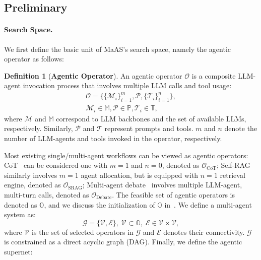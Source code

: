 \documentclass{article}
\theoremstyle{plain}
\theoremstyle{definition}
\newtheorem{definition}[theorem]{Definition}
\theoremstyle{remark}
\newcommand{\ourmethod}{{{MaAS}}\xspace}
\begin{document}
\vspace{-0.4em}
\subsection{Preliminary}\label{sec:prelim}
\vspace{-0.4em}
\paragraph{Search Space.} We first define the basic unit of \ourmethod's search space, namely the agentic operator as follows:
\begin{definition}[\textbf{Agentic Operator}]
\label{def:operator}
An agentic operator $\mathcal{O}$ is a composite LLM-agent invocation process that involves multiple LLM calls and tool usage:
\begin{equation}\label{eq:operator}
\begin{gathered}
\mathcal{O} = \{\{\mathcal{M}_i\}_{i=1}^m, \mathcal{P}, \{\mathcal{T}_i\}_{i=1}^n\},\\
\mathcal{M}_i \in \mathbb{M}, \mathcal{P} \in \mathbb{P}, \mathcal{T}_i \in \mathbb{T},
\end{gathered}
\end{equation}
where $\mathcal{M}$ and $\mathbb{M}$ correspond to LLM backbones and the set of available LLMs, respectively. Similarly, $\mathcal{P}$ and $\mathcal{T}$ represent prompts and tools. $m$ and $n$ denote the number of LLM-agents and tools invoked in the operator, respectively.
\end{definition}
\vspace{-0.3em}
Most existing single/multi-agent workflows can be viewed as agentic operators: CoT~\citep{cot} can be considered one with $m=1$ and $n=0$, denoted as $\mathcal{O}_\text{CoT}$; Self-RAG~\citep{asai2023self-rag} similarly involves $m=1$ agent allocation, but is equipped with $n=1$ retrieval engine, denoted as $\mathcal{O}_\text{SRAG}$; Multi-agent debate~\cite{arXiv2023_MultiAgent-Debate} involves multiple LLM-agent, multi-turn calls, denoted as $\mathcal{O}_\text{Debate}$. The feasible set of agentic operators is denoted as $\mathbb{O}$, and we discuss the initialization of $\mathbb{O}$ in~. We define a multi-agent system as:
\begin{equation}
\mathcal{G} = \{\mathcal{V},\mathcal{E}\},\;\mathcal{V}\subset\mathbb{O},\;\mathcal{E}\in\mathcal{V}\times \mathcal{V},
\end{equation}
where $\mathcal{V}$ is the set of selected operators in $\mathcal{G}$ and $\mathcal{E}$ denotes their connectivity. $\mathcal{G}$ is constrained as a direct acyclic graph (DAG). Finally, we define the agentic supernet:
\end{document}
